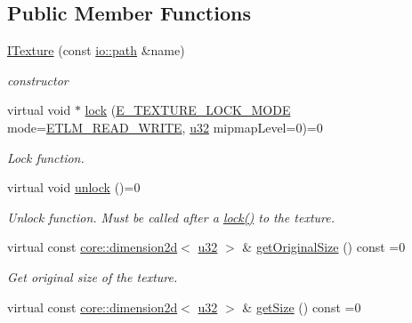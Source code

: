 \subsection*{Public Member Functions}
\begin{DoxyCompactItemize}
\item 
\mbox{\label{classirr_1_1video_1_1ITexture_a32dbd62fef8a65f11e5b440706346c90}} 
\hyperlink{classirr_1_1video_1_1ITexture_a32dbd62fef8a65f11e5b440706346c90}{I\+Texture} (const \hyperlink{namespaceirr_1_1io_ab1bdc45edb3f94d8319c02bc0f840ee1}{io\+::path} \&name)
\begin{DoxyCompactList}\small\item\em constructor \end{DoxyCompactList}\item 
virtual void $\ast$ \hyperlink{classirr_1_1video_1_1ITexture_aa09ee89973a645ebdd2bd61ed859df38}{lock} (\hyperlink{namespaceirr_1_1video_a3916d259e8fe0d0d02e8ee0adc8af5bc}{E\+\_\+\+T\+E\+X\+T\+U\+R\+E\+\_\+\+L\+O\+C\+K\+\_\+\+M\+O\+DE} mode=\hyperlink{namespaceirr_1_1video_a3916d259e8fe0d0d02e8ee0adc8af5bca41973750ecd380c9a17fa575262f5037}{E\+T\+L\+M\+\_\+\+R\+E\+A\+D\+\_\+\+W\+R\+I\+TE}, \hyperlink{namespaceirr_a0416a53257075833e7002efd0a18e804}{u32} mipmap\+Level=0)=0
\begin{DoxyCompactList}\small\item\em Lock function. \end{DoxyCompactList}\item 
virtual void \hyperlink{classirr_1_1video_1_1ITexture_a15b9a25aa18528ade37a492bd7b20a10}{unlock} ()=0
\begin{DoxyCompactList}\small\item\em Unlock function. Must be called after a \hyperlink{classirr_1_1video_1_1ITexture_aa09ee89973a645ebdd2bd61ed859df38}{lock()} to the texture. \end{DoxyCompactList}\item 
virtual const \hyperlink{classirr_1_1core_1_1dimension2d}{core\+::dimension2d}$<$ \hyperlink{namespaceirr_a0416a53257075833e7002efd0a18e804}{u32} $>$ \& \hyperlink{classirr_1_1video_1_1ITexture_adbb05bcee8ec7fa11bb4ccfdb725cda8}{get\+Original\+Size} () const =0
\begin{DoxyCompactList}\small\item\em Get original size of the texture. \end{DoxyCompactList}\item 
virtual const \hyperlink{classirr_1_1core_1_1dimension2d}{core\+::dimension2d}$<$ \hyperlink{namespaceirr_a0416a53257075833e7002efd0a18e804}{u32} $>$ \& \hyperlink{classirr_1_1video_1_1ITexture_adfcf9558c0f1ae543782c03f7903c48e}{get\+Size} () const =0

\end{DoxyCompactItemize}
